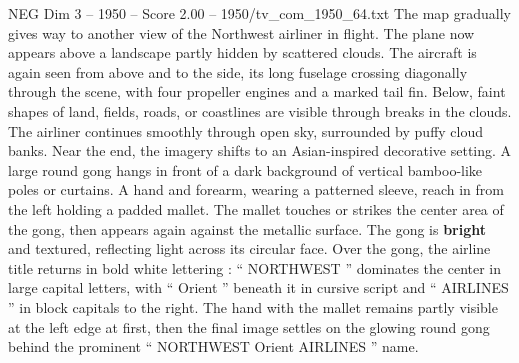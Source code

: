 \begin{textsample}{NEG Dim 3 – 1950 – Score 2.00 – 1950/tv\_com\_1950\_64.txt}
The map gradually gives way to another view of the Northwest airliner in flight.
The plane now appears above a landscape partly hidden by scattered clouds.
The aircraft is again seen from above and to the side, its long fuselage crossing diagonally through the scene, with four propeller engines and a marked tail fin.
Below, faint shapes of land, fields, roads, or coastlines are visible through breaks in the clouds.
The airliner continues smoothly through open sky, surrounded by puffy cloud banks.
Near the end, the imagery shifts to an Asian-inspired decorative setting.
A large round gong hangs in front of a dark background of vertical bamboo-like poles or curtains.
A hand and forearm, wearing a patterned sleeve, reach in from the left holding a padded mallet.
The mallet touches or strikes the center area of the gong, then appears again against the metallic surface.
The gong is \textbf{bright} and textured, reflecting light across its circular face.
Over the gong, the airline title returns in bold white lettering : “ NORTHWEST ” dominates the center in large capital letters, with “ Orient ” beneath it in cursive script and “ AIRLINES ” in block capitals to the right.
The hand with the mallet remains partly visible at the left edge at first, then the final image settles on the glowing round gong behind the prominent “ NORTHWEST Orient AIRLINES ” name.

\end{textsample}

